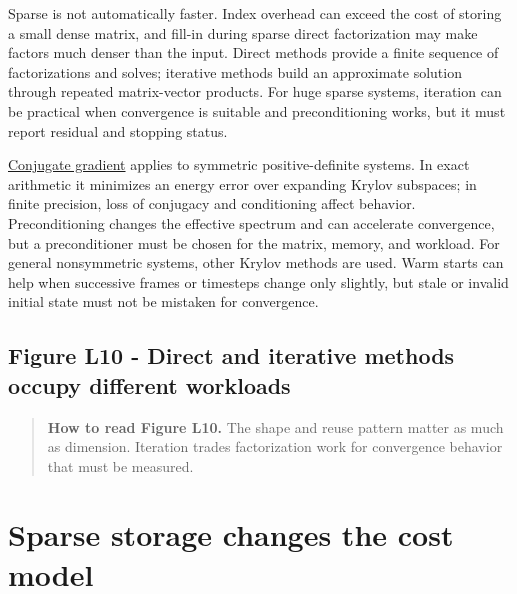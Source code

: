 Sparse is not automatically faster. Index overhead can exceed the cost of storing a small dense matrix, and fill-in during sparse direct factorization may make factors much denser than the input. Direct methods provide a finite sequence of factorizations and solves; iterative methods build an approximate solution through repeated matrix-vector products. For huge sparse systems, iteration can be practical when convergence is suitable and preconditioning works, but it must report residual and stopping status.

\hyperref[02-foundations-ii-ch038-sparse-storage-changes-the-cost-model]{Conjugate gradient} applies to symmetric positive-definite systems. In exact arithmetic it minimizes an energy error over expanding Krylov subspaces; in finite precision, loss of conjugacy and conditioning affect behavior. Preconditioning changes the effective spectrum and can accelerate convergence, but a preconditioner must be chosen for the matrix, memory, and workload. For general nonsymmetric systems, other Krylov methods are used. Warm starts can help when successive frames or timesteps change only slightly, but stale or invalid initial state must not be mistaken for convergence.

\subsection{Figure L10 - Direct and iterative methods occupy different workloads}\label{02-foundations-ii-ch038-figure-l10---direct-and-iterative-methods-occupy-different-workloads}

\hypertarget{02-foundations-ii-ch038-figure-l10---direct-and-iterative-methods-occupy-different-workloads}{}


\begin{quote}
\textbf{How to read Figure L10.} The shape and reuse pattern matter as much as dimension. Iteration trades factorization work for convergence behavior that must be measured.
\end{quote}

\section{Sparse storage changes the cost model}\label{02-foundations-ii-ch038-sparse-storage-changes-the-cost-model}

\hypertarget{02-foundations-ii-ch038-sparse-storage-changes-the-cost-model}{}

